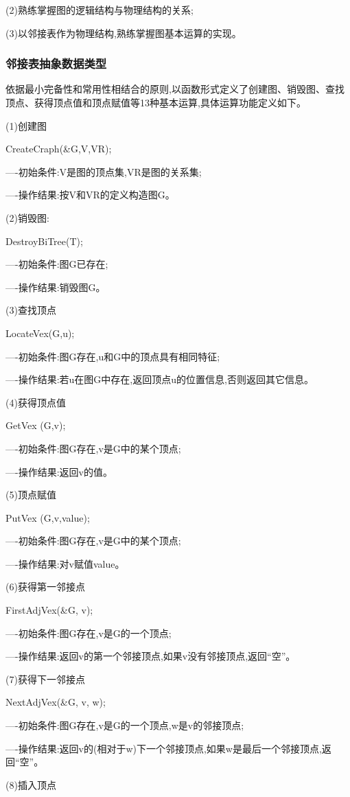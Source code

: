 \documentclass[supercite]{Experimental_Report}
\theoremstyle{definition}
\begin{document}
(2)熟练掌握图的逻辑结构与物理结构的关系;

(3)以邻接表作为物理结构,熟练掌握图基本运算的实现。

\subsubsection{邻接表抽象数据类型}

依据最小完备性和常用性相结合的原则,以函数形式定义了创建图、销毁图、查找顶点、获得顶点值和顶点赋值等13种基本运算,具体运算功能定义如下。

(1)创建图

CreateCraph(\&G,V,VR);

----初始条件:V是图的顶点集,VR是图的关系集;

----操作结果:按V和VR的定义构造图G。

(2)销毁图:

DestroyBiTree(T);

----初始条件:图G已存在;

----操作结果:销毁图G。

(3)查找顶点

LocateVex(G,u);

----初始条件:图G存在,u和G中的顶点具有相同特征;

----操作结果:若u在图G中存在,返回顶点u的位置信息,否则返回其它信息。

(4)获得顶点值

GetVex (G,v);

----初始条件:图G存在,v是G中的某个顶点;

----操作结果:返回v的值。

(5)顶点赋值

PutVex (G,v,value);

----初始条件:图G存在,v是G中的某个顶点;

----操作结果:对v赋值value。

(6)获得第一邻接点

FirstAdjVex(\&G, v);

----初始条件:图G存在,v是G的一个顶点;

----操作结果:返回v的第一个邻接顶点,如果v没有邻接顶点,返回“空”。

(7)获得下一邻接点

NextAdjVex(\&G, v, w);

----初始条件:图G存在,v是G的一个顶点,w是v的邻接顶点;

----操作结果:返回v的(相对于w)下一个邻接顶点,如果w是最后一个邻接顶点,返回“空”。

(8)插入顶点
\end{document}
